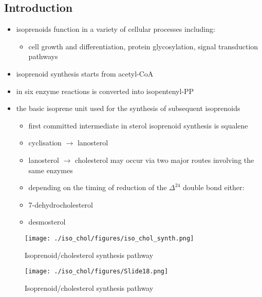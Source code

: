 \documentclass{scrartcl}
\begin{document}
\subsection{Introduction}
\label{sec:org3c0950c}
\begin{itemize}
\item isoprenoids function in a variety of cellular processes including:
\begin{itemize}
\item cell growth and differentiation, protein glycosylation, signal
transduction pathways
\end{itemize}
\item isoprenoid synthesis starts from acetyl-CoA
\item in six enzyme reactions is converted into isopentenyl-PP
\item the basic isoprene unit used for the synthesis of subsequent
isoprenoids
\begin{itemize}
\item first committed intermediate in sterol isoprenoid synthesis is
squalene
\item cyclisation \(\to\) lanosterol
\item lanosterol \(\to\) cholesterol may occur via two major routes involving
the same enzymes
\item depending on the timing of reduction of the \(\Delta^{\text{24}}\) double bond either:
\item 7-dehydrocholesterol
\item desmosterol
\end{itemize}
\end{itemize}


\begin{figure}[htbp]
\centering
\texttt{[image: ./iso\_chol/figures/iso\_chol\_synth.png]}
\caption{\label{fig:org0352650}
Isoprenoid/cholesterol synthesis pathway}
\end{figure}

\begin{figure}[htbp]
\centering
\texttt{[image: ./iso\_chol/figures/Slide18.png]}
\caption{\label{fig:org62c90ad}
Isoprenoid/cholesterol synthesis pathway}
\end{figure}
\end{document}
